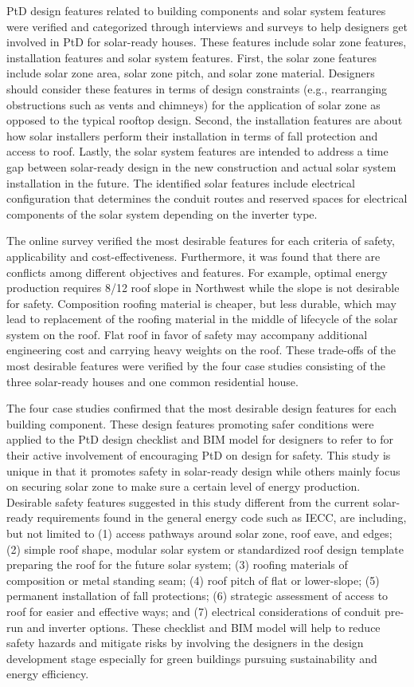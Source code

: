 \documentclass[]{article}
\begin{document}
PtD design features related to building components and solar system
features were verified and categorized through interviews and surveys to
help designers get involved in PtD for solar-ready houses. These
features include solar zone features, installation features and solar
system features. First, the solar zone features include solar zone area,
solar zone pitch, and solar zone material. Designers should consider
these features in terms of design constraints (e.g., rearranging
obstructions such as vents and chimneys) for the application of solar
zone as opposed to the typical rooftop design. Second, the installation
features are about how solar installers perform their installation in
terms of fall protection and access to roof. Lastly, the solar system
features are intended to address a time gap between solar-ready design
in the new construction and actual solar system installation in the
future. The identified solar features include electrical configuration
that determines the conduit routes and reserved spaces for electrical
components of the solar system depending on the inverter type.

The online survey verified the most desirable features for each criteria
of safety, applicability and cost-effectiveness. Furthermore, it was
found that there are conflicts among different objectives and features.
For example, optimal energy production requires 8/12 roof slope in
Northwest while the slope is not desirable for safety. Composition
roofing material is cheaper, but less durable, which may lead to
replacement of the roofing material in the middle of lifecycle of the
solar system on the roof. Flat roof in favor of safety may accompany
additional engineering cost and carrying heavy weights on the roof.
These trade-offs of the most desirable features were verified by the
four case studies consisting of the three solar-ready houses and one
common residential house.

The four case studies confirmed that the most desirable design features
for each building component. These design features promoting safer
conditions were applied to the PtD design checklist and BIM model for
designers to refer to for their active involvement of encouraging PtD on
design for safety. This study is unique in that it promotes safety in
solar-ready design while others mainly focus on securing solar zone to
make sure a certain level of energy production. Desirable safety
features suggested in this study different from the current solar-ready
requirements found in the general energy code such as IECC, are
including, but not limited to (1) access pathways around solar zone,
roof eave, and edges; (2) simple roof shape, modular solar system or
standardized roof design template preparing the roof for the future
solar system; (3) roofing materials of composition or metal standing
seam; (4) roof pitch of flat or lower-slope; (5) permanent installation
of fall protections; (6) strategic assessment of access to roof for
easier and effective ways; and (7) electrical considerations of conduit
pre-run and inverter options. These checklist and BIM model will help to
reduce safety hazards and mitigate risks by involving the designers in
the design development stage especially for green buildings pursuing
sustainability and energy efficiency.
\end{document}

